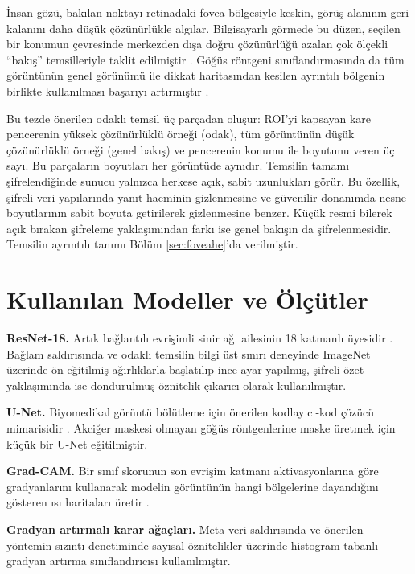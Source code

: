 İnsan gözü, bakılan noktayı retinadaki fovea bölgesiyle keskin, görüş alanının geri kalanını daha düşük çözünürlükle algılar. Bilgisayarlı görmede bu düzen, seçilen bir konumun çevresinde merkezden dışa doğru çözünürlüğü azalan çok ölçekli ``bakış'' temsilleriyle taklit edilmiştir \cite{mnih2014attention}. Göğüs röntgeni sınıflandırmasında da tüm görüntünün genel görünümü ile dikkat haritasından kesilen ayrıntılı bölgenin birlikte kullanılması başarıyı artırmıştır \cite{guan2018agcnn}.

Bu tezde önerilen odaklı temsil üç parçadan oluşur: ROI'yi kapsayan kare pencerenin yüksek çözünürlüklü örneği (odak), tüm görüntünün düşük çözünürlüklü örneği (genel bakış) ve pencerenin konumu ile boyutunu veren üç sayı. Bu parçaların boyutları her görüntüde aynıdır. Temsilin tamamı şifrelendiğinde sunucu yalnızca herkese açık, sabit uzunlukları görür. Bu özellik, şifreli veri yapılarında yanıt hacminin gizlenmesine \cite{kamara2019volume} ve güvenilir donanımda nesne boyutlarının sabit boyuta getirilerek gizlenmesine \cite{poddar2020visor} benzer. Küçük resmi bilerek açık bırakan şifreleme yaklaşımından \cite{tajik2019tpe} farkı ise genel bakışın da şifrelenmesidir. Temsilin ayrıntılı tanımı Bölüm \ref{sec:foveahe}'da verilmiştir.

\section{Kullanılan Modeller ve Ölçütler}\label{sec:models}

\textbf{ResNet-18.} Artık bağlantılı evrişimli sinir ağı ailesinin 18 katmanlı üyesidir \cite{he2016resnet}. Bağlam saldırısında ve odaklı temsilin bilgi üst sınırı deneyinde ImageNet \cite{deng2009imagenet} üzerinde ön eğitilmiş ağırlıklarla başlatılıp ince ayar yapılmış, şifreli özet yaklaşımında ise dondurulmuş öznitelik çıkarıcı olarak kullanılmıştır.

\textbf{U-Net.} Biyomedikal görüntü bölütleme için önerilen kodlayıcı-kod çözücü mimarisidir \cite{ronneberger2015unet}. Akciğer maskesi olmayan göğüs röntgenlerine maske üretmek için küçük bir U-Net eğitilmiştir.

\textbf{Grad-CAM.} Bir sınıf skorunun son evrişim katmanı aktivasyonlarına göre gradyanlarını kullanarak modelin görüntünün hangi bölgelerine dayandığını gösteren ısı haritaları üretir \cite{selvaraju2017gradcam}.

\textbf{Gradyan artırmalı karar ağaçları.} Meta veri saldırısında ve önerilen yöntemin sızıntı denetiminde sayısal öznitelikler üzerinde histogram tabanlı gradyan artırma sınıflandırıcısı kullanılmıştır.

